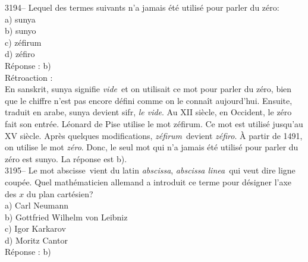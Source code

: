 \documentclass[letterpaper, 12pt]{article}
\begin{document}
3194-- Lequel des termes suivants n'a jamais \'et\'e utilis\'e pour parler du z\'ero:\\

a) sunya\\
b) sunyo\\
c) z\'efirum\\
d) z\'efiro\\

R\'eponse : b)\\

R\'etroaction :\\
En sanskrit, sunya signifie \og\emph{vide}\fg \ et on utilisait ce mot pour parler du z\'ero, bien que le chiffre n'est pas encore d\'efini comme on le conna\^it aujourd'hui. Ensuite, traduit en arabe, sunya devient sifr, \og\emph{le vide}\fg. Au {\scriptsize XII\ieme{}} si\`ecle, en Occident, le z\'ero fait son entr\'ee. L\'eonard de Pise utilise le mot z\'efirum. Ce mot est utilis\'e jusqu'au {\scriptsize XV\ieme{}} si\`ecle. Apr\`es quelques modifications, \og\emph{z\'efirum}\fg \ devient \og\emph{z\'efiro}\fg. \`A partir de 1491, on utilise le mot \og\emph{z\'ero}\fg. Donc, le seul mot qui n'a jamais \'et\'e utilis\'e pour parler du z\'ero est sunyo. La r\'eponse est b).\\



3195-- Le mot \og abscisse\fg \ vient du latin \og\emph{abscissa}\fg, \og\emph{abscissa linea}\fg \ qui veut dire \og ligne coup\'ee\fg. Quel math\'ematicien allemand a introduit ce terme pour d\'esigner l'axe des $x$ du plan cart\'esien?\\

a) Carl Neumann\\
b) Gottfried Wilhelm von Leibniz\\
c) Igor Karkarov\\
d) Moritz Cantor\\

R\'eponse : b)\\
\end{document}
